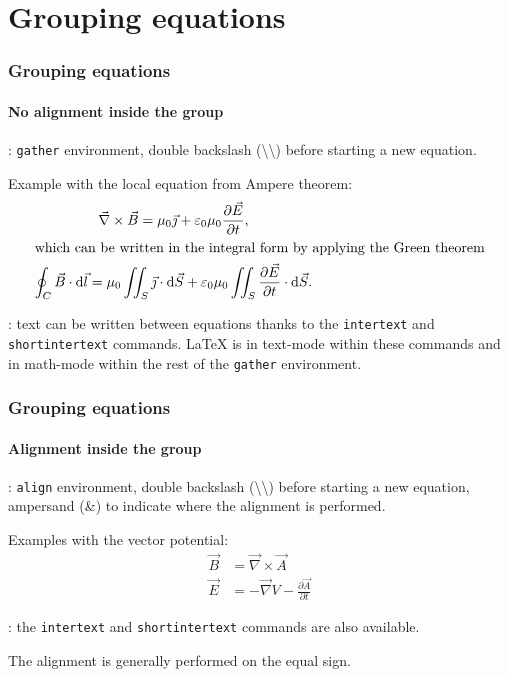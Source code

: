 \documentclass[11pt]{beamer}
\begin{document}
\section{Grouping equations}

\begin{frame}
	\frametitle{Grouping equations}
	\framesubtitle{No alignment inside the group}
	
	: \alert{\texttt{gather}} environment, double backslash (\textbackslash\textbackslash) before starting a new equation.
	
	Example with the local equation from Ampere theorem:
	\begin{gather}
		\vec{\nabla} \times \vec{B}
			= \mu_0 \vec{\jmath}
			+ \varepsilon_0 \mu_0 \frac{\partial \vec{E}}{\partial t}, \\
		\intertext{which can be written in the integral form by applying the Green theorem}
		\oint_{C} \vec{B} \cdot \mathrm{d} \vec{l}
			= \mu_0 \iint_S \vec{\jmath} \cdot \mathrm{d} \vec{S}
			+ \varepsilon_0 \mu_0 \iint_S \frac{\partial \vec{E}}{\partial t} \cdot \mathrm{d} \vec{S}.
	\end{gather}
	
	: text can be written between equations thanks to the \texttt{intertext} and \texttt{shortintertext} commands.
	\LaTeX{} is in text-mode within these commands and in math-mode within the rest of the \texttt{gather} environment.
\end{frame}

\begin{frame}
	\frametitle{Grouping equations}
	\framesubtitle{Alignment inside the group}
	
	: \texttt{align} environment, double backslash (\textbackslash\textbackslash) before starting a new equation, ampersand (\&) to indicate where the alignment is performed.
	
	Examples with the vector potential:
	\begin{align}
		\vec{B} &= \vec{\nabla} \times \vec{A} \\
		\vec{E} &= -\vec{\nabla} V - \frac{\partial \vec{A}}{\partial t}
	\end{align}
	
	 : the \texttt{intertext} and \texttt{shortintertext} commands are also available.
	 
	 The alignment is generally performed on the equal sign.
\end{frame}
\end{document}
